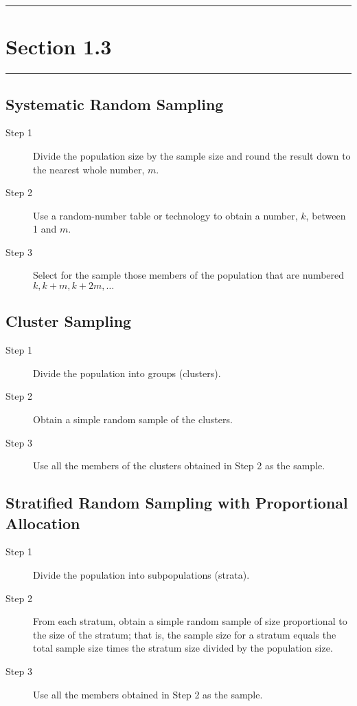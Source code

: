 \documentclass[12pt]{article}
\begin{document}
    \noindent\rule{\textwidth}{0.4pt}
    \section*{Section 1.3}
    \noindent\rule{\textwidth}{0.4pt}
        \subsection*{Systematic Random Sampling}
            \begin{description}
                \item[Step 1] Divide the population size by the sample size and round the
                result down to the nearest whole number, $m$. 
                \item[Step 2] Use a random-number table or technology to obtain a number,
                $k$, between 1 and $m$.
                \item[Step 3] Select for the sample those members of the population that
                are numbered $k, k+m, k+2m,\dots$
            \end{description}
        \subsection*{Cluster Sampling}
            \begin{description}
                \item[Step 1] Divide the population into groups (clusters).
                \item[Step 2] Obtain a simple random sample of the clusters.
                \item[Step 3] Use all the members of the clusters obtained in Step 2 as
                the sample.   
            \end{description}
        \subsection*{Stratified Random Sampling with Proportional Allocation}
            \begin{description}
                \item[Step 1] Divide the population into subpopulations (strata).
                \item[Step 2] From each stratum, obtain a simple random sample of size
                proportional to the size of the stratum; that is, the sample size for a
                stratum equals the total sample size times the stratum size divided by the
                population size.
                \item[Step 3] Use all the members obtained in Step 2 as the sample.  
            \end{description}
\end{document}
